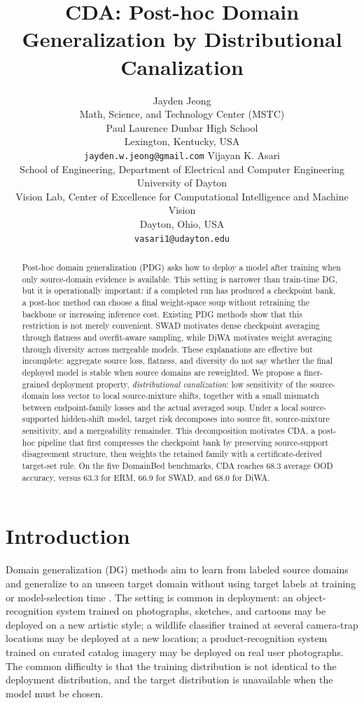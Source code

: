 \documentclass{article}
\title{CDA: Post-hoc Domain Generalization by Distributional Canalization}
\author{
Jayden Jeong\\
Math, Science, and Technology Center (MSTC)\\
Paul Laurence Dunbar High School\\
Lexington, Kentucky, USA\\
\texttt{jayden.w.jeong@gmail.com}
\And
Vijayan K. Asari\\
School of Engineering, Department of Electrical and Computer Engineering\\
University of Dayton\\
Vision Lab, Center of Excellence for Computational Intelligence and Machine Vision\\
Dayton, Ohio, USA\\
\texttt{vasari1@udayton.edu}
}
\theoremstyle{definition}
\begin{document}
\maketitle

\begin{abstract}
\vspace{-.5em}
Post-hoc domain generalization (PDG) asks how to deploy a model after training when only source-domain evidence is available. This setting is narrower than train-time DG, but it is operationally important: if a completed run has produced a checkpoint bank, a post-hoc method can choose a final weight-space soup without retraining the backbone or increasing inference cost. Existing PDG methods show that this restriction is not merely convenient. SWAD motivates dense checkpoint averaging through flatness and overfit-aware sampling, while DiWA motivates weight averaging through diversity across mergeable models. These explanations are effective but incomplete: aggregate source loss, flatness, and diversity do not say whether the final deployed model is stable when source domains are reweighted. We propose a finer-grained deployment property, \emph{distributional canalization}: low sensitivity of the source-domain loss vector to local source-mixture shifts, together with a small mismatch between endpoint-family losses and the actual averaged soup. Under a local source-supported hidden-shift model, target risk decomposes into source fit, source-mixture sensitivity, and a mergeability remainder. This decomposition motivates CDA, a post-hoc pipeline that first compresses the checkpoint bank by preserving source-support disagreement structure, then weights the retained family with a certificate-derived target-set rule. On the five DomainBed benchmarks, CDA reaches 68.3 average OOD accuracy, versus 63.3 for ERM, 66.9 for SWAD, and 68.0 for DiWA.
\end{abstract}

\section{Introduction}

Domain generalization (DG) methods aim to learn from labeled source domains and generalize to an unseen target domain without using target labels at training or model-selection time \citep{muandet2013domain,li2017deeper,gulrajani2021domainbed}. The setting is common in deployment: an object-recognition system trained on photographs, sketches, and cartoons may be deployed on a new artistic style; a wildlife classifier trained at several camera-trap locations may be deployed at a new location; a product-recognition system trained on curated catalog imagery may be deployed on real user photographs. The common difficulty is that the training distribution is not identical to the deployment distribution, and the target distribution is unavailable when the model must be chosen.
\end{document}
